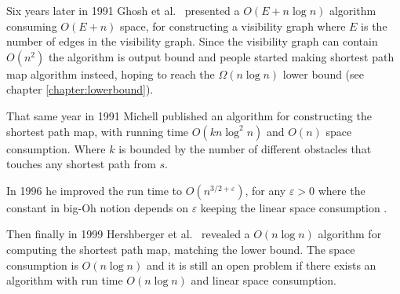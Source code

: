 Six years later in 1991 Ghosh et al.\ \cite{GhoshM91} presented a $O(E+n\log n)$
algorithm consuming $O(E+n)$ space, for constructing a visibility graph where
$E$ is the number of edges in the visibility graph.
Since the visibility graph can contain $O(n^2)$ the algorithm is output bound
and people started making shortest path map algorithm insteed, hoping to reach
the $\Omega{(n\log n)}$ lower bound (see chapter \ref{chapter:lowerbound}).

That same year in 1991 Michell \cite{DBLP:journals/amai/Mitchell91} published
an algorithm for constructing the shortest path map, with running time
$O(kn\log^2 n)$ and $O(n)$ space consumption. Where $k$ is bounded by the
number of different obstacles that touches any shortest path from $s$.

In 1996 he improved the run time to $O(n^{3/2+\varepsilon})$, for any
$\varepsilon>0$ where the constant in big-Oh notion depends on $\varepsilon$
keeping the linear space consumption  \cite{DBLP:journals/ijcga/Mitchell96}.

Then finally in 1999 Hershberger et al.\ \cite{HershbergerS99} revealed a
$O(n\log n)$ algorithm for computing the shortest path map, matching the lower
bound. The space consumption is $O(n\log n)$ and it is still an open problem if
there exists an algorithm with run time $O(n\log n)$ and linear space
consumption.


